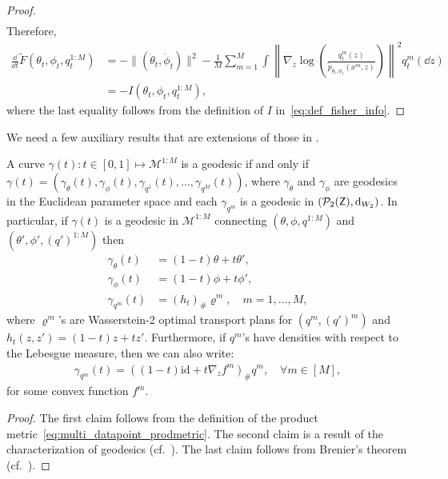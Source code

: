 \begin{proof}
\begin{align*}
    \end{align*}
    Therefore,
    \begin{align*}
        \frac{\dd}{\dd t} \tilde{F}(\theta_t,\phi_t,q_t^{1:M})
        &= - \|(\dot{\theta}_t,\dot{\phi}_t)\|^2 - \frac{1}{M}\sum_{m=1}^M \int \left\| \nabla_z \log \left(\frac{q_t^m(z)}{\tilde{p}_{\theta_t,\phi_t}(x^m,z)}\right) \right\|^2 q_t^m(\dd z) \\
        &= - I(\theta_t,\phi_t,q_t^{1:M}),
    \end{align*}
    where the last equality follows from the definition of $I$ in~\eqref{eq:def_fisher_info}.
\end{proof}

We need a few auxiliary results that are extensions of those in \citet{caprioerrorboundsparticle2024}.
\begin{lemma}\label{lem:geodesic}
    A curve $\gamma(t) : t \in [0, 1] \mapsto \mathcal{M}^{1:M}$ is a geodesic if and only if $\gamma(t) = (\gamma_{\theta}(t), \gamma_\phi (t), \gamma_{q^1}(t), \ldots, \gamma_{q^M}(t))$, where $\gamma_{\theta}$ and $\gamma_\phi$ are geodesics in the Euclidean parameter space and each $\gamma_{q^m}$ is a geodesic in $(\mathcal{P}_2({\mathsf{Z}}), \mathrm{d}_{W_2})$. In particular, if $\gamma(t)$ is a geodesic in $\mathcal{M}^{1:M}$ connecting $(\theta, \phi, q^{1:M})$ and $(\theta', \phi', (q')^{1:M})$ then 
    \begin{align*}
        \gamma_{\theta}(t) &= (1-t)\theta + t\theta', \\
        \gamma_{\phi}(t) &= (1-t)\phi + t\phi', \\
        \gamma_{q^m}(t) &= (h_t)_{\#}\varrho^m, \quad m=1,\ldots,M,
    \end{align*}
    where $\varrho^m$'s are Wasserstein-2 optimal transport plans for $(q^m, (q')^m)$ and $h_t(z,z') = (1-t)z + tz'$. Furthermore, if $q^m$'s have densities with respect to the Lebesgue measure, then we can also write:
    \begin{align*}
        \gamma_{q^m}(t) = ((1-t)\mathrm{id} + t\nabla_z f^m)_{\#} q^m, \quad \forall m \in [M],
    \end{align*}
    for some convex function $f^m$.
\end{lemma}
\begin{proof}
    The first claim follows from the definition of the product metric~\eqref{eq:multi_datapoint_prodmetric}. The second claim is a result of the characterization of geodesics (cf.~\citet[Theorem 5.27]{santambrogio2015optimal}). The last claim follows from Brenier's theorem (cf.~\citet[Theorem 1.17]{santambrogio2015optimal}).
\end{proof}

